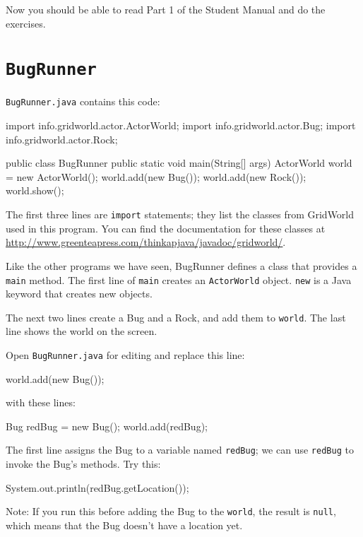 Now you should be able to read Part 1 of the Student Manual and do
the exercises.

\section{{\tt BugRunner}}

{\tt BugRunner.java} contains this code:

\begin{code}
import info.gridworld.actor.ActorWorld;
import info.gridworld.actor.Bug;
import info.gridworld.actor.Rock;

public class BugRunner
{
    public static void main(String[] args)
    {
        ActorWorld world = new ActorWorld();
        world.add(new Bug());
        world.add(new Rock());
        world.show();
    }
}
\end{code}

The first three lines are {\tt import} statements; they list the
classes from GridWorld used in this program.  You can find the
documentation for these classes at
\url{http://www.greenteapress.com/thinkapjava/javadoc/gridworld/}.

Like the other programs we have seen, BugRunner defines a class
that provides a {\tt main} method.  The first line of {\tt main}
creates an {\tt ActorWorld} object.  {\tt new} is a Java keyword
that creates new objects.

The next two lines create a Bug and a Rock, and add them to {\tt world}.
The last line shows the world on the screen.

Open {\tt BugRunner.java} for editing and replace this line:

\begin{code}
    world.add(new Bug());
\end{code}

with these lines:

\begin{code}
    Bug redBug = new Bug();
    world.add(redBug);
\end{code}

The first line assigns the Bug to a variable named {\tt redBug};
we can use {\tt redBug} to invoke the Bug's methods.  Try this:

\begin{code}
    System.out.println(redBug.getLocation());
\end{code}

Note: If you run this before adding the Bug to the {\tt world}, the result is
{\tt null}, which means that the Bug doesn't have a location yet.

